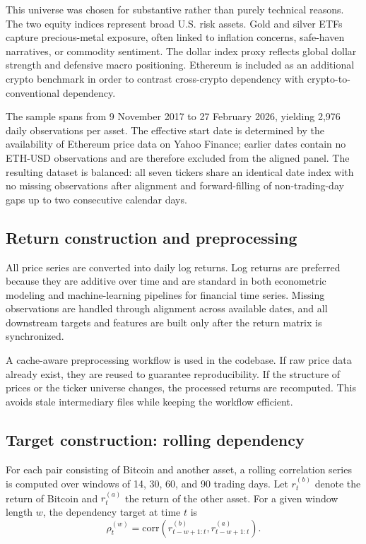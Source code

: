 This universe was chosen for substantive rather than purely technical reasons. The two equity indices represent broad U.S. risk assets. Gold and silver ETFs capture precious-metal exposure, often linked to inflation concerns, safe-haven narratives, or commodity sentiment. The dollar index proxy reflects global dollar strength and defensive macro positioning. Ethereum is included as an additional crypto benchmark in order to contrast cross-crypto dependency with crypto-to-conventional dependency.

The sample spans from 9 November 2017 to 27 February 2026, yielding 2{,}976 daily observations per asset. The effective start date is determined by the availability of Ethereum price data on Yahoo Finance; earlier dates contain no ETH-USD observations and are therefore excluded from the aligned panel. The resulting dataset is balanced: all seven tickers share an identical date index with no missing observations after alignment and forward-filling of non-trading-day gaps up to two consecutive calendar days.

\subsection{Return construction and preprocessing}

All price series are converted into daily log returns. Log returns are preferred because they are additive over time and are standard in both econometric modeling and machine-learning pipelines for financial time series. Missing observations are handled through alignment across available dates, and all downstream targets and features are built only after the return matrix is synchronized.

A cache-aware preprocessing workflow is used in the codebase. If raw price data already exist, they are reused to guarantee reproducibility. If the structure of prices or the ticker universe changes, the processed returns are recomputed. This avoids stale intermediary files while keeping the workflow efficient.

\subsection{Target construction: rolling dependency}

For each pair consisting of Bitcoin and another asset, a rolling correlation series is computed over windows of 14, 30, 60, and 90 trading days. Let $r_t^{(b)}$ denote the return of Bitcoin and $r_t^{(a)}$ the return of the other asset. For a given window length $w$, the dependency target at time $t$ is
\[
\rho_t^{(w)} = \text{corr}(r_{t-w+1:t}^{(b)}, r_{t-w+1:t}^{(a)}).
\]

